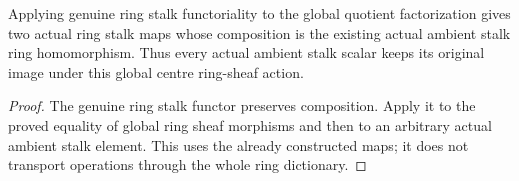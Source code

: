 \begin{theorem}
\label{hir:real-domain-actual-centre-ring-sheaf-stalk-factorization}
\leanok
Applying genuine ring stalk functoriality to the global quotient
factorization gives two actual ring stalk maps whose composition is the
existing actual ambient stalk ring homomorphism. Thus every actual
ambient stalk scalar keeps its original image under this global centre
ring-sheaf action.
\end{theorem}
\begin{proof}
The genuine ring stalk functor preserves composition. Apply it to the
proved equality of global ring sheaf morphisms and then to an arbitrary
actual ambient stalk element. This uses the already constructed maps;
it does not transport operations through the whole ring dictionary.
\end{proof}
